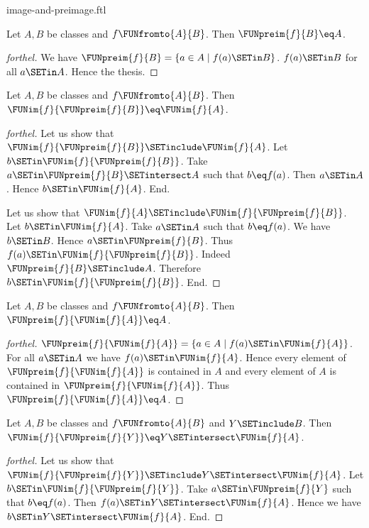\documentclass{stex}
\begin{document}
\begin{smodule}{image-and-preimage.ftl}
\begin{proposition}[forthel,id=FOUNDATIONS_07_6541963008409600]
  Let $A, B$ be classes and $f \FUNfromto{A}{B}$.
  Then $\FUNpreim{f}{B} \eq A$.
\end{proposition}
\begin{proof}[forthel]
  We have $\FUNpreim{f}{B} = \{ a \in A \mid f(a) \SETin B \}$.
  $f(a) \SETin B$ for all $a \SETin A$.
  Hence the thesis.
\end{proof}

\begin{proposition}[forthel,id=FOUNDATIONS_07_1913313581596672]
  Let $A, B$ be classes and $f \FUNfromto{A}{B}$.
  Then $\FUNim{f}{\FUNpreim{f}{B}} \eq \FUNim{f}{A}$.
\end{proposition}
\begin{proof}[forthel]
  Let us show that $\FUNim{f}{\FUNpreim{f}{B}} \SETinclude \FUNim{f}{A}$.
    Let $b \SETin \FUNim{f}{\FUNpreim{f}{B}}$.
    Take $a \SETin \FUNpreim{f}{B} \SETintersect A$ such that $b \eq f(a)$.
    Then $a \SETin A$.
    Hence $b \SETin \FUNim{f}{A}$.
  End.

  Let us show that $\FUNim{f}{A} \SETinclude \FUNim{f}{\FUNpreim{f}{B}}$.
    Let $b \SETin \FUNim{f}{A}$.
    Take $a \SETin A$ such that $b \eq f(a)$.
    We have $b \SETin B$.
    Hence $a \SETin \FUNpreim{f}{B}$.
    Thus $f(a) \SETin \FUNim{f}{\FUNpreim{f}{B}}$.
    Indeed $\FUNpreim{f}{B} \SETinclude A$.
    Therefore $b \SETin \FUNim{f}{\FUNpreim{f}{B}}$.
  End.
\end{proof}

\begin{proposition}[forthel,id=FOUNDATIONS_07_3819758101200896]
  Let $A, B$ be classes and $f \FUNfromto{A}{B}$.
  Then $\FUNpreim{f}{\FUNim{f}{A}} \eq A$.
\end{proposition}
\begin{proof}[forthel]
  $\FUNpreim{f}{\FUNim{f}{A}} = \{ a \in A \mid f(a) \SETin \FUNim{f}{A} \}$.
  For all $a \SETin A$ we have $f(a) \SETin \FUNim{f}{A}$.
  Hence every element of $\FUNpreim{f}{\FUNim{f}{A}}$ is contained in $A$ and every element of $A$ is contained in $\FUNpreim{f}{\FUNim{f}{A}}$.
  Thus $\FUNpreim{f}{\FUNim{f}{A}} \eq A$.
\end{proof}

\begin{proposition}[forthel,id=FOUNDATIONS_07_7760514696347648]
  Let $A, B$ be classes and $f \FUNfromto{A}{B}$ and $Y \SETinclude B$.
  Then $\FUNim{f}{\FUNpreim{f}{Y}} \eq Y \SETintersect \FUNim{f}{A}$.
\end{proposition}
\begin{proof}[forthel]
  Let us show that $\FUNim{f}{\FUNpreim{f}{Y}} \SETinclude Y \SETintersect \FUNim{f}{A}$.
    Let $b \SETin \FUNim{f}{\FUNpreim{f}{Y}}$.
    Take $a \SETin \FUNpreim{f}{Y}$ such that $b \eq f(a)$.
    Then $f(a) \SETin Y \SETintersect \FUNim{f}{A}$.
    Hence we have $b \SETin Y \SETintersect \FUNim{f}{A}$.
  End.


\end{proof}
\end{smodule}
\end{document}
